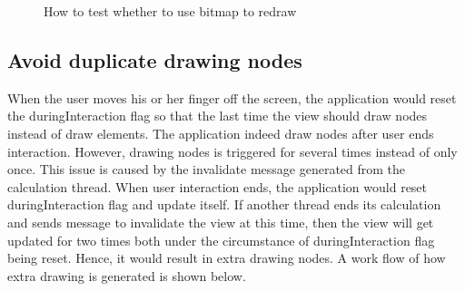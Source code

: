 \documentclass[a4paper,11pt,twoside]{report}
\begin{document}
\begin{figure}[H]
\caption{How to test whether to use bitmap to redraw}
\end{figure}

\subsection{Avoid duplicate drawing nodes}

When the user moves his or her finger off the screen, the application would reset the duringInteraction flag so that the last time the view should draw nodes instead of draw elements. The application indeed draw nodes after user ends interaction. However, drawing nodes is triggered for several times instead of only once. This issue is caused by the invalidate message generated from the calculation thread. When user interaction ends, the application would reset duringInteraction flag and update itself. If another thread ends its calculation and sends message to invalidate the view at this time, then the view will get updated for two times both under the circumstance of duringInteraction flag being reset. Hence, it would result in extra drawing nodes. A work flow of how extra drawing is generated is shown below.
\end{document}
